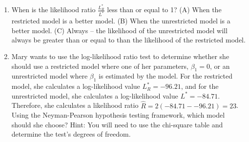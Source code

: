 \documentclass[11pt]{article}
\begin{document}
\begin{enumerate}
\item When is the likelihood ratio $\frac{L^*_R}{L^*}$ less than or equal to 1?  (A) When the restricted model is a better model.  (B) When the unrestricted model is a better model.  (C) Always -- the likelihood of the unrestricted model will always be greater than or equal to than the likelihood of the restricted model.  

\item Mary wants to use the log-likelihood ratio test to determine whether she should use a restricted model where one of her parameters, $\beta_1=0$, or an unrestricted model where $\beta_1$ is estimated by the model.    For the restricted model, she calculates a log-likelihood value $L^*_R=-96.21$, and for the unrestricted model, she calculates a log-likelihood value $L^*=-84.71$.  Therefore, she calculates a likelihood ratio $\hat{R} = 2(-84.71 - -96.21) = 23$.   Using the Neyman-Pearson hypothesis testing framework, which model should she choose?  Hint: You will need to use the chi-square table and determine the test's degrees of freedom. 

\end{enumerate}
\end{document}
